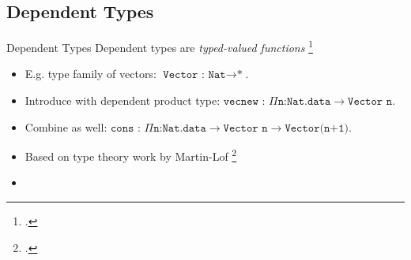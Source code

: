 \documentclass[aspectratio=169]{beamer}
\begin{document}


\subsection{Dependent Types}

\begin{frame}{Dependent Types}
    Dependent types are \emph{typed-valued functions} \footcite{pierce_advanced_2005}
    \begin{itemize}
        \item E.g. type family of vectors: $\texttt{Vector : Nat}\rightarrow\texttt{*}$.
        \item Introduce with \alert{dependent product type}: $\texttt{vecnew : }\Pi\texttt{n:Nat.data}\rightarrow\texttt{Vector n}$.
        \item Combine as well: $\texttt{cons : }\Pi\texttt{n:Nat.data}\rightarrow\texttt{Vector n}\rightarrow\texttt{Vector(n+1)}$.
        \item Based on type theory work by Martin-L\:of \footcite{martin-lof_constructive_1984}
        \item {}
    \end{itemize}
\end{frame}
\end{document}
